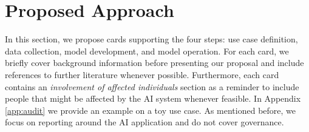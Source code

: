 \newpage
\section{Proposed Approach}
In this section, we propose cards supporting the four steps: use case definition, data collection, model development, and model operation. For each card, we briefly cover background information before presenting our proposal and include references to further literature whenever possible. Furthermore, each card contains an \emph{involvement of affected individuals} section as a reminder to include people that might be affected by the AI system whenever feasible.
In Appendix \ref{app:audit} we provide an example on a toy use case. As mentioned before, we focus on reporting around the AI application and do not cover governance. 




